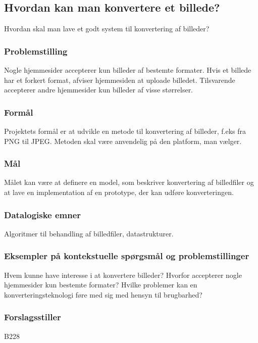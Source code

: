 \subsection*{Hvordan kan man konvertere et billede?}
Hvordan skal man lave et godt system til konvertering af billeder?

\subsubsection*{Problemstilling}
Nogle hjemmesider accepterer kun billeder af bestemte formater. Hvis et billede har et forkert format, afviser hjemmesiden at uploade billedet. Tilsvarende accepterer andre hjemmesider kun billeder af visse størrelser.

\subsubsection*{Formål}
Projektets formål er at udvikle en metode til konvertering af billeder, f.eks fra PNG til JPEG. Metoden skal være anvendelig på den platform, man vælger.

\subsubsection*{Mål}
Målet kan være at definere en model, som beskriver konvertering af billedfiler og at lave en implementation af en prototype, der kan udføre konverteringen.

\subsubsection*{Datalogiske emner}
Algoritmer til behandling af billedfiler, datastrukturer.

\subsubsection*{Eksempler på kontekstuelle spørgsmål og problemstillinger}
Hvem kunne have interesse i at konvertere billeder? Hvorfor accepterer nogle hjemmesider kun bestemte formater? Hvilke problemer kan en konverteringsteknologi føre med sig med hensyn til brugbarhed?

\subsubsection*{Forslagsstiller}
B228